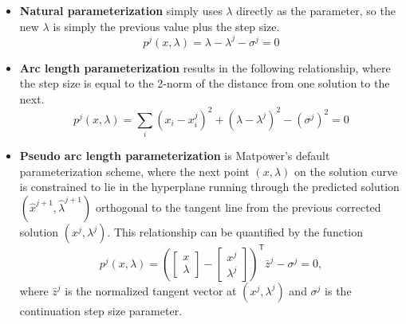 \documentclass[12pt]{article}
\newcommand{\matpower}[0]{{\sc Matpower}}
\newcommand{\trans}[1]{{#1}^{\ensuremath{\mathsf{T}}}}  %
\numberwithin{equation}{section}
\numberwithin{table}{section}
\numberwithin{figure}{section}
\begin{document}
\begin{itemize}

\item{\bf Natural parameterization} simply uses $\lambda$ directly as the parameter, so the new $\lambda$ is simply the previous value plus the step size.
\begin{equation}
p^j(x,\lambda) = \lambda - \lambda^j - \sigma^j = 0
\label{eq:natural_parm}
\end{equation}

\item {\bf Arc length parameterization} results in the following relationship, where the step size is equal to the 2-norm of the distance from one solution to the next.
\begin{equation}
p^j(x,\lambda) = \sum\limits_i(x_i - x_i^j)^2 + (\lambda - \lambda^j)^2 - (\sigma^j)^2 = 0
\label{eq:arc_parm}
\end{equation}
\item {\bf Pseudo arc length parameterization} \cite{mori2002} is \matpower{}'s default parameterization scheme, where the next point $(x,\lambda)$ on the solution curve is constrained to lie in the hyperplane running through the predicted solution $(\hat{x}^{j+1}, \hat{\lambda}^{j+1})$ orthogonal to the tangent line from the previous corrected solution $(x^j,\lambda^j)$. This relationship can be quantified by the function
\begin{equation}
p^j(x,\lambda) = \trans{ \left(\left[\begin{array}{c}x \\ \lambda\end{array}\right] - \left[\begin{array}{c}x^{j} \\ \lambda^j\end{array}\right]\right) } \bar{z}^j -\sigma^j = 0,
\label{eq:psuedo_arc_parm}
\end{equation}
where $\bar{z}^j$ is the normalized tangent vector at $(x^j, \lambda^j)$ and $\sigma^j$ is the continuation step size parameter.

\end{itemize}
\end{document}
